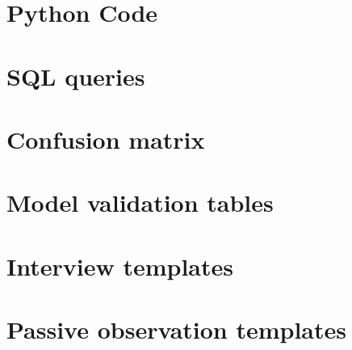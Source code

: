 \appendix
\chapter{Python Code}

\chapter{SQL queries}

\chapter{Confusion matrix}

\chapter{Model validation tables}

\chapter{Interview templates}

\chapter{Passive observation templates}

